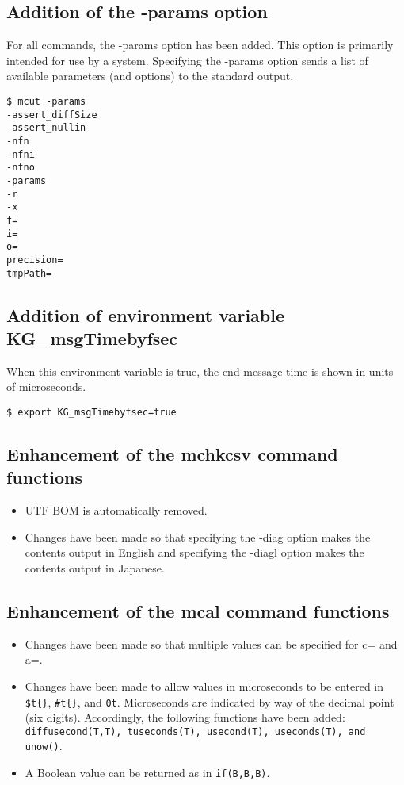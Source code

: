 \subsection{Addition of the -params option}
For all commands, the -params option has been added. This option is primarily intended for use by a system. Specifying the -params option sends a list of available parameters (and options) to the standard output.

\begin{Verbatim}[baselinestretch=0.7,frame=single]
$ mcut -params
-assert_diffSize
-assert_nullin
-nfn
-nfni
-nfno
-params
-r
-x
f=
i=
o=
precision=
tmpPath=
\end{Verbatim}

\subsection{Addition of environment variable KG\_msgTimebyfsec}
When this environment variable is true, the end message time is shown in units of microseconds.

\begin{Verbatim}[baselinestretch=0.7,frame=single]
$ export KG_msgTimebyfsec=true
\end{Verbatim}

\subsection{Enhancement of the mchkcsv command functions}

\begin{itemize}
 \item UTF BOM is automatically removed.
 \item Changes have been made so that specifying the -diag option makes the contents output in English and specifying the -diagl option makes the contents output in Japanese.
\end{itemize}

\subsection{Enhancement of the mcal command functions}
\begin{itemize}
 \item Changes have been made so that multiple values can be specified for c= and a=.
 \item Changes have been made to allow values in microseconds to be entered in \verb|$t{}|, \verb|#t{}|, and \verb|0t|. Microseconds are indicated by way of the decimal point (six digits). Accordingly, the following functions have been added: \verb|diffusecond(T,T), tuseconds(T), usecond(T), useconds(T), and unow()|.
 \item A Boolean value can be returned as in \verb|if(B,B,B)|.
\end{itemize}

